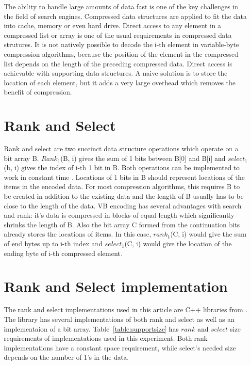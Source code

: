 The ability to handle large amounts of data fast is one of the key challenges in the field of search engines. Compressed data structures are applied to fit the 
data into cache, memory or even hard drive. Direct access to any element in a compressed list or array is one of the usual requirements in compressed data 
strutures. It is not natively possible to decode the i-th element in variable-byte compression algorithms, because the position of the element in the compressed
list depends on the length of the preceding compressed data. Direct access is achievable with supporting data structures. A naive solution is to store the location 
of each element, but it adds a very large overhead which removes the benefit of compression.

\section{Rank and Select}
Rank and select are two succinct data structure operations which operate on a bit array B. $Rank_1$(B, i) gives the sum of 1 bits between B[0] and B[i] and 
$select_1$(b, i) gives the index of i-th 1 bit in B. Both operations can be implemented to work in constant time \citep{gbmp2014sea}. Locations of 1 bits in B should represent locations 
of the items in the encoded data. For most compression algorithms, this requires B to be created in addition to the existing data and the length of B usually 
has to be close to the length of the data. VB encoding has several advantages with search and rank: it's data is compressed in blocks of equal length which 
significantly shrinks the length of B. Also the bit array C formed from the continuation bits already stores the locations of items. In this case, $rank_1$(C, i) 
would give the sum of end bytes up to i-th index and $select_1$(C, i) would give the location of the ending byte of i-th compressed element.

\section{Rank and Select implementation}

The rank and select implementations used in this article are C++ libraries from \citep{gbmp2014sea}. The library has several implementations of both rank and 
select as well as an implementaion of a bit array. Table~\ref{table:supportsize} has $rank$ and $select$ size requirements of implementations used in this experiment.
Both rank implementations have a constant space requirement, while select's needed size depends on the number of 1's in the data.

